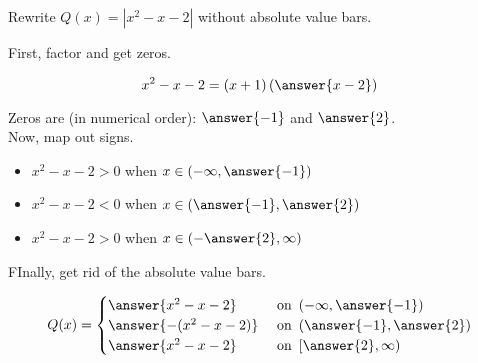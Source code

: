 \documentclass{ximera}
\author{Lee Wayand}
\begin{document}
\begin{example}











Rewrite $Q(x) = | x^2 - x - 2 |$ without absolute value bars.



\begin{explanation}


First, factor and get zeros.

\[
x^2 - x - 2 = (x+1)\left( \answer{x-2} \right)
\]



Zeros are (in numerical order):  $\answer{-1}$  and  $\answer{2}$. \\





Now, map out signs.


\begin{itemize}
\item $x^2 - x - 2 > 0$ when $x \in \left( -\infty, \answer{-1} \right)$
\item $x^2 - x - 2 < 0$ when $x \in \left( \answer{-1}, \answer{2} \right)$
\item $x^2 - x - 2 > 0$ when $x \in \left( -\answer{2} , \infty \right)$
\end{itemize}







FInally, get rid of the absolute value bars.



\[
Q(x) = 
\begin{cases}
  \answer{x^2 - x - 2} & \text{ on } \left( -\infty, \answer{-1} \right)   \\
  \answer{-(x^2 - x - 2)} & \text{ on } \left( \answer{-1}, \answer{2} \right)   \\
  \answer{x^2 - x - 2}  & \text{ on } \left[ \answer{2}, \infty \right)
\end{cases}
\]






\end{explanation}






\end{example}
\end{document}
